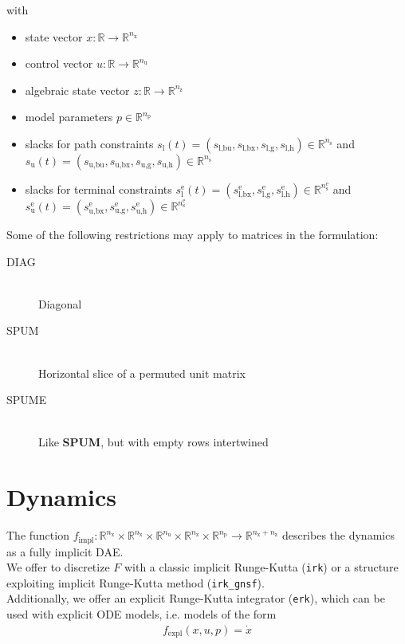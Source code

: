 \documentclass{article}
\newcommand{\code}[1]{\texttt{#1}}
\newcommand{\ind}[1]{_{\textrm{#1}}}
\newcommand{\terminal}{^{\textrm{e}}}
\newcommand{\Lower}{\ind{l}}
\newcommand{\lowerh}{\ind{l,h}}
\newcommand{\lowerbx}{\ind{l,bx}}
\newcommand{\lowerbu}{\ind{l,bu}}
\newcommand{\lowerg}{\ind{l,g}}
\newcommand{\upper}{\ind{u}}
\newcommand{\upperh}{\ind{u,h}}
\newcommand{\upperbx}{\ind{u,bx}}
\newcommand{\upperbu}{\ind{u,bu}}
\newcommand{\upperg}{\ind{u,g}}
\newcommand{\R}{\mathbb{R}}
\newcommand{\nx}{n\ind{x}}
\newcommand{\nuu}{n\ind{u}}
\newcommand{\nz}{n\ind{z}}
\newcommand{\np}{n\ind{p}}
\newcommand{\ns}{n\ind{s}}
\begin{document}
with
\begin{itemize}
\item state vector $ x: \R \rightarrow \R^{\nx} $
\item control vector $ u: \R \rightarrow \R^{\nuu} $
\item algebraic state vector $ z: \R \rightarrow \R^{\nz} $
\item model parameters $ p \in \R^{\np} $
\item slacks for path constraints $ s\Lower(t) = (s\lowerbu, s\lowerbx, s\lowerg, s\lowerh) \in \R^{\ns} $ and $ s\upper(t) = (s\upperbu, s\upperbx, s\upperg, s\upperh) \in \R^{\ns} $
\item slacks for terminal constraints $ s\Lower\terminal(t) = (s\lowerbx\terminal, s\lowerg\terminal, s\lowerh\terminal) \in \R^{\ns\terminal} $ and $ s\upper\terminal(t) = (s\upperbx\terminal, s\upperg\terminal, s\upperh\terminal) \in \R^{\ns\terminal} $
\end{itemize}

Some of the following restrictions may apply to matrices in the formulation:
\begin{description}
  \item[DIAG] \hfill \\ Diagonal
  \item[SPUM] \hfill \\ Horizontal slice of a permuted unit matrix
  \item[SPUME] \hfill \\ Like \textbf{SPUM}, but with empty rows intertwined
\end{description}


\section{Dynamics}
The function $ f\ind{impl}: \mathbb{R}^{\nx}\times\mathbb{R}^{\nx}\times\mathbb{R}^{\nuu}\times\mathbb{R}^{\nz}\times\mathbb{R}^{\np} \rightarrow \mathbb{R}^{\nx+\nz}$ describes the dynamics as a fully implicit DAE.\\
We offer to discretize $ F $ with a classic implicit Runge-Kutta (\code{irk}) or a structure exploiting implicit Runge-Kutta method (\code{irk\_gnsf}).\\
Additionally, we offer an explicit Runge-Kutta integrator (\code{erk}), which can be used with explicit ODE models, i.e. models of the form
\begin{align*}
f\ind{expl}(x,u,p) = \dot{x}
\end{align*}
\end{document}
